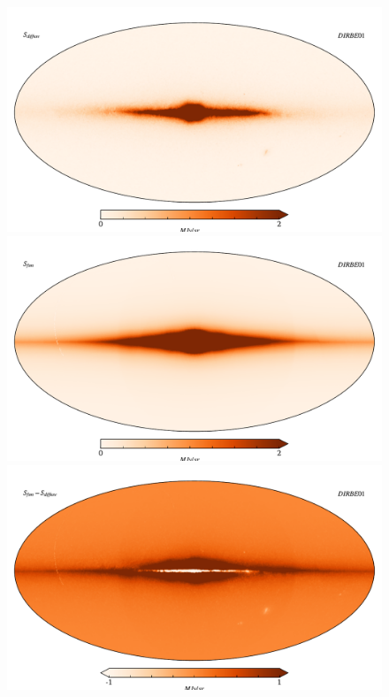 \documentclass{aa}
\begin{document}
\begin{figure}
\includegraphics[width=\columnwidth]{figs/diffuseTemplate/diffuse_stars.pdf}
  \includegraphics[width=\columnwidth]{figs/diffuseTemplate/dirbe_template.pdf}\\
  \includegraphics[width=\columnwidth]{figs/diffuseTemplate/diffuse_diff.pdf}\\

\end{figure}
\end{document}
